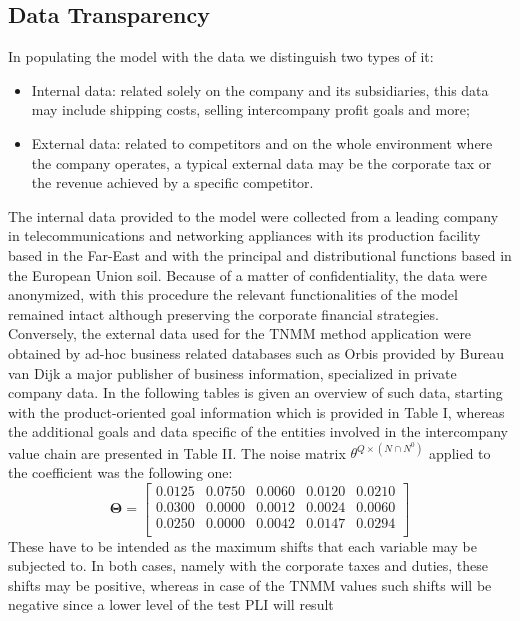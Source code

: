 \documentclass[conference,final,]{IEEEtran}
\begin{document}
\hypertarget{data transparency}{%
\subsection{Data Transparency}\label{data transparency}}
In populating the model with the data we distinguish two types of it:
\begin{itemize}
\item Internal data: related solely on the company and its subsidiaries, this data may include shipping costs, selling intercompany profit goals and more;
\item External data: related to competitors and on the whole environment where the company operates, a typical external data may be the corporate tax or the revenue achieved by a specific competitor.
\end{itemize}
The internal data provided to the model were collected from a leading company in telecommunications and networking appliances with its production facility based in the Far-East and with the principal and distributional functions based in the European Union soil. Because of a matter of confidentiality, the data were anonymized, with this procedure the relevant functionalities of the model remained intact although preserving the corporate financial strategies. Conversely, the external data used for the TNMM method application were obtained by ad-hoc business related databases such as Orbis \cite{orbis} provided by Bureau van Dijk a major publisher of business information, specialized in private company data. In the following tables is given an overview of such data, starting with the product-oriented goal information which is provided in Table I, whereas the additional goals and data specific of the entities involved in the intercompany value chain are presented in Table II. The noise matrix \(\theta^{Q \times (N\cap N^0) }\) applied to the coefficient was the following one:
\[ \mathbf{\Theta} =  \begin{bmatrix}
 0.0125 & 0.0750 & 0.0060 & 0.0120 & 0.0210 \\
 0.0300 & 0.0000 & 0.0012 & 0.0024 & 0.0060 \\
 0.0250 & 0.0000 & 0.0042 & 0.0147 & 0.0294 \\
 \end{bmatrix} \]
These have to be intended as the maximum shifts that each variable may
be subjected to. In both cases, namely with the corporate taxes and duties,
these shifts may be positive, whereas in case of the TNMM values such
shifts will be negative since a lower level of the test PLI will result
\end{document}

